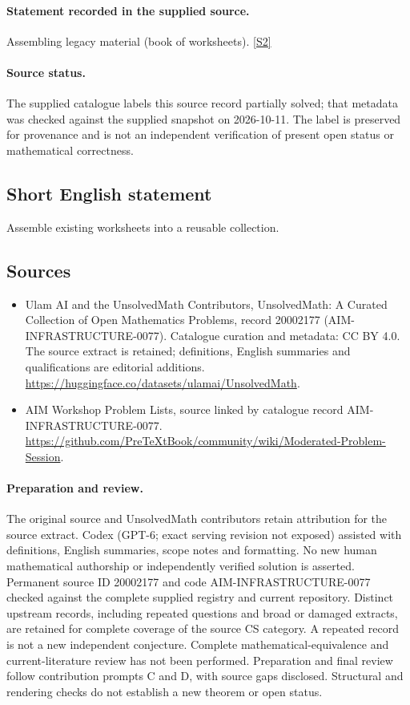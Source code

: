 \documentclass[11pt]{article}
\begin{document}
\paragraph{Statement recorded in the supplied source.}
Assembling legacy material (book of worksheets). \href{https://github.com/PreTeXtBook/community/wiki/Moderated-Problem-Session}{[S2]}
\paragraph{Source status.}
The supplied catalogue labels this source record partially solved; that metadata was checked against the supplied snapshot on 2026-10-11. The label is preserved for provenance and is not an independent verification of present open status or mathematical correctness.
\subsection{Short English statement}
Assemble existing worksheets into a reusable collection.
\subsection{Sources}
\begin{itemize}
\item[S1] Ulam AI and the UnsolvedMath Contributors, UnsolvedMath: A Curated Collection of Open Mathematics Problems, record 20002177 (AIM-INFRASTRUCTURE-0077). Catalogue curation and metadata: CC BY 4.0. The source extract is retained; definitions, English summaries and qualifications are editorial additions.
\url{https://huggingface.co/datasets/ulamai/UnsolvedMath}.
\item[S2] AIM Workshop Problem Lists, source linked by catalogue record AIM-INFRASTRUCTURE-0077.
\url{https://github.com/PreTeXtBook/community/wiki/Moderated-Problem-Session}.
\end{itemize}
\paragraph{Preparation and review.}
The original source and UnsolvedMath contributors retain attribution for the source extract. Codex (GPT-6; exact serving revision not exposed) assisted with definitions, English summaries, scope notes and formatting. No new human mathematical authorship or independently verified solution is asserted. Permanent source ID 20002177 and code AIM-INFRASTRUCTURE-0077 checked against the complete supplied registry and current repository. Distinct upstream records, including repeated questions and broad or damaged extracts, are retained for complete coverage of the source CS category. A repeated record is not a new independent conjecture. Complete mathematical-equivalence and current-literature review has not been performed. Preparation and final review follow contribution prompts C and D, with source gaps disclosed. Structural and rendering checks do not establish a new theorem or open status.
\label{end:20002177}
\end{document}
